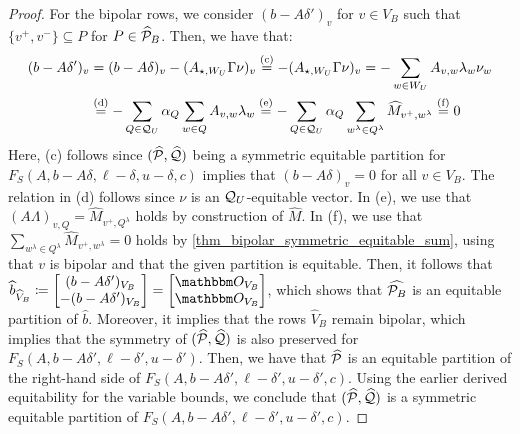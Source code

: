 \documentclass[pdflatex,sn-mathphys-num]{sn-jnl}%
\theoremstyle{thmstyleone}%
\theoremstyle{thmstylethree}%
\theoremstyle{thmstyletwo}%
\begin{document}
\begin{proof}
    For the bipolar rows, we consider $(b-A \delta')_v$ for $v\in V_B$ such that $\{v^+,v^-\} \subseteq P$ for $P \in \widehat{\mathcal{P}}_B$. Then, we have that:
    \begin{align*}
        (b- A \delta')_{v} &= (b - A \delta)_v - (A_{\star,W_U} \Gamma \nu)_v \stackrel{\textup{(c)}}= - (A_{\star,W_U} \Gamma \nu)_v = - \sum_{w\in W_U} A_{v,w}\lambda_w \nu_w \\
        &\stackrel{\textup{(d)}}= - \sum_{Q\in \mathcal{Q}_U} \alpha_Q \sum_{w\in Q} A_{v,w} \lambda_w \stackrel{\textup{(e)}}= - \sum_{Q\in \mathcal{Q}_U} \alpha_Q \sum_{w^\lambda \in Q^\lambda} \widehat{M}_{v^+,w^\lambda} \stackrel{\textup{(f)}}= 0 
    \end{align*}
    Here, \textup{(c)} follows since $(\widehat{\mathcal{P}},\widehat{\mathcal{Q}})$ being a symmetric equitable partition for $F_S(A,b- A \delta, \ell-\delta, u - \delta,c)$ implies that $(b-A \delta)_v = 0$ for all $v\in V_B$. The relation in \textup{(d)} follows since $\nu$ is an $\mathcal{Q}_U$-equitable vector. In \textup{(e)}, we use that $(A \Lambda)_{v,Q} = \widehat{M}_{v^+,Q^\lambda}$ holds by construction of $\widehat{M}$. In \textup{(f)}, we use that $\sum_{w^\lambda \in Q^\lambda} \widehat{M}_{v^+,w^\lambda} = 0$ holds by \cref{thm_bipolar_symmetric_equitable_sum}, using that $v$ is bipolar and that the given partition is equitable. Then, it follows that $\widehat{b}_{\widehat{V}_B} \coloneqq \begin{bmatrix}
    (b - A \delta')_{V_B}\\
    -(b - A \delta')_{V_B}\\
\end{bmatrix} = \begin{bmatrix}
    \zerovec_{V_B}\\
    \zerovec_{V_B}
\end{bmatrix}$, which shows that $\widehat{\mathcal{P}_B}$ is an equitable partition of $\widehat{b}$. Moreover, it implies that the rows $\widehat{V}_B$ remain bipolar, which implies that the symmetry of $(\widehat{\mathcal{P}},\widehat{\mathcal{Q}})$ is also preserved for $F_S(A,b- A \delta', \ell - \delta',u- \delta')$. Then, we have that $\widehat{\mathcal{P}}$ is an equitable partition of the right-hand side of $F_S(A,b- A \delta', \ell- \delta',u-\delta',c)$. Using the earlier derived equitability for the variable bounds, we conclude that $(\widehat{\mathcal{P}},\widehat{\mathcal{Q}})$ is a symmetric equitable partition of $F_S(A,b- A \delta', \ell- \delta',u-\delta',c)$.
\end{proof}
\end{document}
